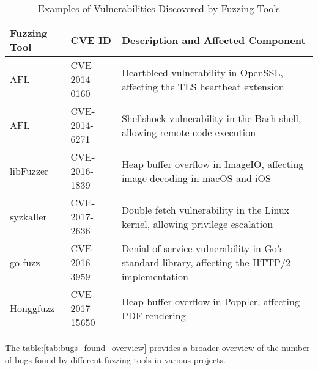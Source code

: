 \begin{table}[h!]
\centering
\begin{tabularx}{\textwidth}{@{}>{\raggedright\arraybackslash}p{2cm}>{\raggedright\arraybackslash}p{3cm}X@{}}
\toprule
\textbf{Fuzzing Tool} & \textbf{CVE ID} & \textbf{Description and Affected Component} \\
\midrule
AFL & CVE-2014-0160 & Heartbleed vulnerability in OpenSSL, affecting the TLS heartbeat extension\cite{durumeric2014matter} \\
\addlinespace
AFL & CVE-2014-6271 & Shellshock vulnerability in the Bash shell, allowing remote code execution\cite{shetty2018shellshock} \\
\addlinespace
libFuzzer & CVE-2016-1839  & Heap buffer overflow in ImageIO, affecting image decoding in macOS and iOS \\
\addlinespace
syzkaller & CVE-2017-2636  & Double fetch vulnerability in the Linux kernel, allowing privilege escalation\cite{wang2017double} \\
\addlinespace
go-fuzz & CVE-2016-3959  & Denial of service vulnerability in Go's standard library, affecting the HTTP/2 implementation \\
\addlinespace
Honggfuzz & CVE-2017-15650  & Heap buffer overflow in Poppler, affecting PDF rendering\cite{haller2013dowsing} \\
\bottomrule
\end{tabularx}
\caption{Examples of Vulnerabilities Discovered by Fuzzing Tools}
\label{tab:vulnerabilities_examples}
\end{table}

The table:\ref{tab:bugs_found_overview} provides a broader overview of the number of bugs found by
different fuzzing tools in various projects.

